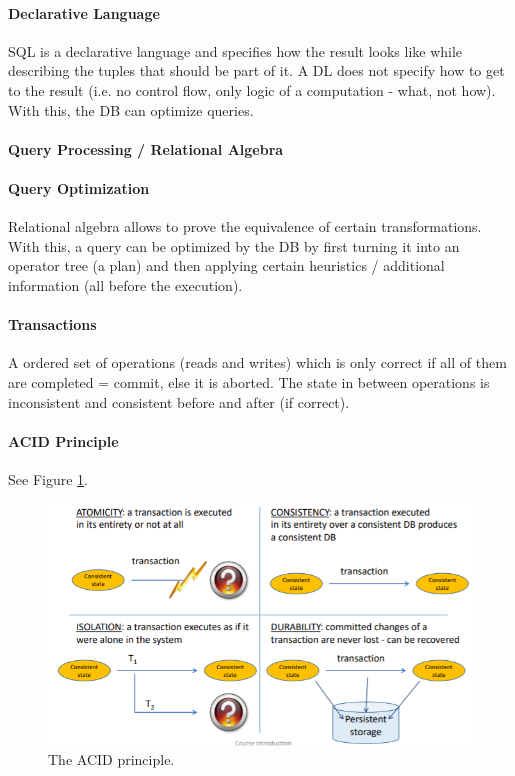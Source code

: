 \paragraph{Declarative Language}
SQL is a declarative language and specifies how the result looks like while describing the tuples that should be part of it. A DL does not specify how to get to the result (i.e. no control flow, only logic of a computation - what, not how). With this, the DB can optimize queries.

\paragraph{Query Processing / Relational Algebra}


\paragraph{Query Optimization}
Relational algebra allows to prove the equivalence of certain transformations. With this, a query can be optimized by the DB by first turning it into an operator tree (a plan) and then applying certain heuristics / additional information (all before the execution). %

\paragraph{Transactions}
A ordered set of operations (reads and writes) which is only correct if all of them are completed = commit, else it is aborted. The state in between operations is inconsistent and consistent before and after (if correct). %

\paragraph{ACID Principle}
See Figure \ref{fig:acid}.

\begin{figure}[h]
	\centering
	\includegraphics[scale=0.8]{images/00-acid.PNG}
	\caption{The ACID principle.}
	\label{fig:acid}
\end{figure}

